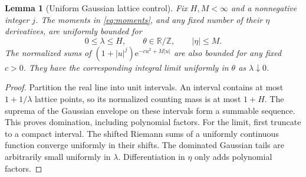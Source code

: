\documentclass[11pt,a4paper]{article}
\numberwithin{equation}{section}
\newtheorem{lemma}[theorem]{Lemma}
\theoremstyle{definition}\newtheorem{definition}[theorem]{Definition}
\theoremstyle{remark}\newtheorem{remark}[theorem]{Remark}
\newcommand{\e}{\mathrm e}
\newcommand{\R}{\mathbb R}
\newcommand{\Z}{\mathbb Z}
\begin{document}
\begin{lemma}[Uniform Gaussian lattice control]
\label{lem:gaussian}
Fix $H,M<\infty$ and a nonnegative integer $j$. The moments in
\eqref{eq:moments}, and any fixed number of their $\eta$ derivatives, are
uniformly bounded for
\[
 0\le\lambda\le H,\qquad\theta\in\R/\Z,\qquad |\eta|\le M.
\]
The normalized sums of $(1+|u|^j)\e^{-c u^2+M|u|}$ are also bounded for
any fixed $c>0$. They have the corresponding integral limit uniformly in
$\theta$ as $\lambda\downarrow0$.
\end{lemma}
\begin{proof}
Partition the real line into unit intervals. An interval contains at most
$1+1/\lambda$ lattice points, so its normalized counting mass is at most
$1+H$. The suprema of the Gaussian envelope on these intervals form a
summable sequence. This proves domination, including polynomial factors.
For the limit, first truncate to a compact interval. The shifted Riemann
sums of a uniformly continuous function converge uniformly in their shifts.
The dominated Gaussian tails are arbitrarily small uniformly in $\lambda$.
Differentiation in $\eta$ only adds polynomial factors.
\end{proof}
\end{document}
